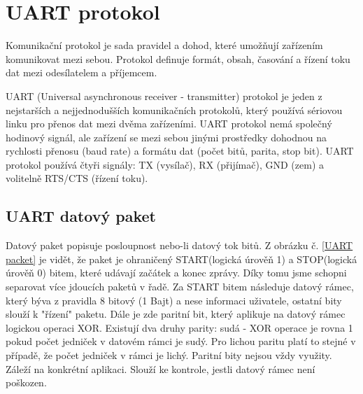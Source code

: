 

\section{UART protokol}
\label{UART protokol}
Komunikační protokol je sada pravidel a dohod, které umožňují zařízením komunikovat mezi sebou. Protokol definuje formát, obsah, časování a řízení toku dat mezi odesílatelem a příjemcem.

UART (Universal asynchronous receiver - transmitter) protokol je jeden z nejstarších a nejjednodušších komunikačních protokolů, který používá sériovou linku pro přenos dat mezi dvěma zařízeními. UART protokol nemá společný hodinový signál, ale zařízení se mezi sebou jinými prostředky dohodnou na rychlosti přenosu (baud rate) a formátu dat (počet bitů, parita, stop bit). UART protokol používá čtyři signály: TX (vysílač), RX (přijímač), GND (zem) a volitelně RTS/CTS (řízení toku). \cite{ser kom} %

\subsection{UART datový paket}
\label{UARTt}
Datový paket popisuje posloupnost nebo-li datový tok bitů. Z obrázku č. \ref{UART packet} je vidět, že paket je ohraničený START(logická úrověň 1) a STOP(logická úrověň 0) bitem, které udávají začátek a konec zprávy. Díky tomu jsme schopni separovat více jdoucích paketů v řadě. Za START bitem následuje datový rámec, který býva z pravidla 8 bitový (1 Bajt) a nese informaci uživatele, ostatní bity slouží k "řízení" paketu. Dále je zde paritní bit, který aplikuje na datový rámec logickou operaci XOR. Existují dva druhy parity: sudá - XOR operace je rovna 1 pokud počet jedniček v datovém rámci je sudý.  Pro lichou paritu platí to stejné v případě, že počet jedniček v rámci je lichý. Paritní bity nejsou vždy využity. Záleží na konkrétní aplikaci. Slouží ke kontrole, jestli datový rámec není poškozen. \cite{ser kom} %

